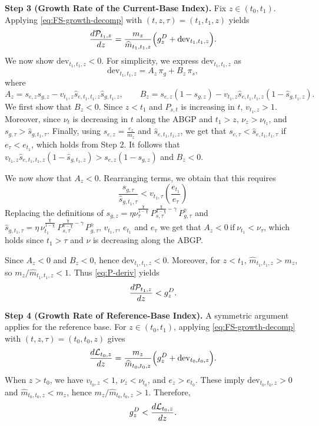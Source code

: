 \documentclass[12pt,a4paper]{article}
\begin{document}
\begin{appendices}
\medskip
\noindent\textbf{Step 3 (Growth Rate of the Current-Base Index).}
Fix \(z\in(t_0,t_1)\). Applying \eqref{eq:FS-growth-decomp} with \((t,z,\tau)=(t_1,t_1,z)\) yields
\begin{equation}\label{eq:P-deriv}
\frac{d{\cal P}_{t_1,z}}{dz}
=
\frac{m_z}{\widehat m_{t_1,t_1,z}}
\Big(g_z^D+\mathrm{dev}_{t_1,t_1,z}\Big).
\end{equation}
We now show \(\mathrm{dev}_{t_1,t_1,z}<0\). For simplicity, we express $\mathrm{dev}_{t_1,t_1,z}$ as
\[
\mathrm{dev}_{t_1,t_1,z}
=
A_z\,\pi_g + B_z\,\pi_s,
\]
where
\[
A_z=s_{e,z}s_{g,z}-v_{t_1,z}\widehat s_{e,t_1,t_1,z}\widehat s_{g,t_1,z},
\qquad
B_z=s_{e,z}(1-s_{g,z})-v_{t_1,z}\widehat s_{e,t_1,t_1,z}(1-\widehat s_{g,t_1,z}).
\]
We first show that $B_z<0$. Since \(z<t_1\) and \(P_{s,t}\) is increasing in $t$, \(v_{t_1,z}>1\). Moreover, since \(\nu_t\) is decreasing in $t$ along the ABGP and $t_{1}>z$, \(\nu_z>\nu_{t_1}\), and $s_{g,\tau}>\widehat{s}_{g,t_{1},\tau}$. Finally, using $s_{e,z}=\frac{e_{z}}{m_{z}}$ and $\widehat{s}_{e,t_{1},t_{1},z}$, we get that $s_{e,\tau}<\widehat{s}_{e,t_{1},t_{1},\tau}$ if $e_{\tau}<e_{t_{1}}$, which holds from Step 2. It follows that $v_{t_1,z} \widehat s_{e,t_1,t_1,z}( 1-\widehat s_{g,t_1,z})>s_{e,z}(1-s_{g,z})$ and $B_{z}<0$.

We now show that $A_{z}<0$. Rearranging terms, we obtain that this requires 
$$\frac{s_{g,\tau}}{\widehat{s}_{g,t_{1},\tau}}<v_{t_{1},\tau}\left(\frac{e_{t_{1}}}{e_{\tau}}\right)$$
Replacing the definitions of $s_{g,z}=\eta\nu_{\tau}^{\frac{\chi}{1-\chi}}\,P_{s,\tau}^{\frac{\chi}{1-\chi}-\gamma}\,P_{g,\tau}^{\gamma}$ and $\widehat{s}_{g,t_{1},\tau}=\eta\,\nu_{t_{1}}^{\frac{\chi}{1-\chi}}\,P_{s,\tau}^{\frac{\chi}{1-\chi}-\gamma}\,P_{g,\tau}^{\gamma}$, $v_{t_{1},\tau}$, $e_{t_{1}}$ and $e_{\tau}$ we get that $A_{z}< 0 \  \text{if} \ \nu_{t_{1}}<\nu_{\tau}$, which holds since $t_{1}>\tau$ and $\nu$ is decreasing along the ABGP. 


Since \(A_z<0\) and \(B_z<0\), hence \(\mathrm{dev}_{t_1,t_1,z}<0\).
Moreover, for \(z<t_1\), \(\widehat m_{t_1,t_1,z}>m_z\), so \(m_z/\widehat m_{t_1,t_1,z}<1\).
Thus \eqref{eq:P-deriv} yields
\[
\frac{d{\cal P}_{t_1,z}}{dz}
<
g_z^D.
\]

\medskip
\noindent\textbf{Step 4 (Growth Rate of Reference-Base Index).}
A symmetric argument applies for the reference base. For \(z\in(t_0,t_1)\), applying \eqref{eq:FS-growth-decomp} with \((t,z,\tau)=(t_0,t_0,z)\) gives
\[
\frac{d{\cal L}_{t_0,z}}{dz}
=
\frac{m_z}{\widehat m_{t_0,t_0,z}}
\Big(g_z^D+\mathrm{dev}_{t_0,t_0,z}\Big).
\]
When \(z>t_0\), we have \(v_{t_0,z}<1\), \(\nu_z<\nu_{t_0}\), and \(e_z>e_{t_0}\). These imply \(\mathrm{dev}_{t_0,t_0,z}>0\) and \(\widehat m_{t_0,t_0,z}<m_z\), hence \(m_z/\widehat m_{t_0,t_0,z}>1\). Therefore,
\[
g_z^D<\frac{d{\cal L}_{t_0,z}}{dz}.
\]


\end{appendices}
\end{document}
